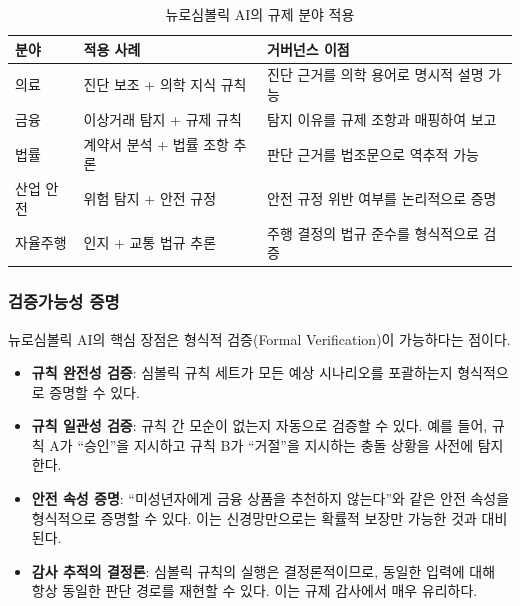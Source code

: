 \begin{table}[htbp]
\centering
\caption{뉴로심볼릭 AI의 규제 분야 적용}
\label{tab:20_neurosymbolic}
\begin{tabularx}{\textwidth}{p{2cm}p{4cm}X}
\toprule
\textbf{분야} & \textbf{적용 사례} & \textbf{거버넌스 이점} \\
\midrule
의료 & 진단 보조 + 의학 지식 규칙 & 진단 근거를 의학 용어로 명시적 설명 가능 \\
금융 & 이상거래 탐지 + 규제 규칙 & 탐지 이유를 규제 조항과 매핑하여 보고 \\
법률 & 계약서 분석 + 법률 조항 추론 & 판단 근거를 법조문으로 역추적 가능 \\
산업 안전 & 위험 탐지 + 안전 규정 & 안전 규정 위반 여부를 논리적으로 증명 \\
자율주행 & 인지 + 교통 법규 추론 & 주행 결정의 법규 준수를 형식적으로 검증 \\
\bottomrule
\end{tabularx}
\end{table}

\subsubsection{검증가능성 증명}

뉴로심볼릭 AI의 핵심 장점은 형식적 검증(Formal Verification)이 가능하다는 점이다.

\begin{itemize}
 \item \textbf{규칙 완전성 검증}: 심볼릭 규칙 세트가 모든 예상 시나리오를 포괄하는지 형식적으로 증명할 수 있다.
 \item \textbf{규칙 일관성 검증}: 규칙 간 모순이 없는지 자동으로 검증할 수 있다. 예를 들어, 규칙 A가 ``승인''을 지시하고 규칙 B가 ``거절''을 지시하는 충돌 상황을 사전에 탐지한다.
 \item \textbf{안전 속성 증명}: ``미성년자에게 금융 상품을 추천하지 않는다''와 같은 안전 속성을 형식적으로 증명할 수 있다. 이는 신경망만으로는 확률적 보장만 가능한 것과 대비된다.
 \item \textbf{감사 추적의 결정론}: 심볼릭 규칙의 실행은 결정론적이므로, 동일한 입력에 대해 항상 동일한 판단 경로를 재현할 수 있다. 이는 규제 감사에서 매우 유리하다.
\end{itemize}

